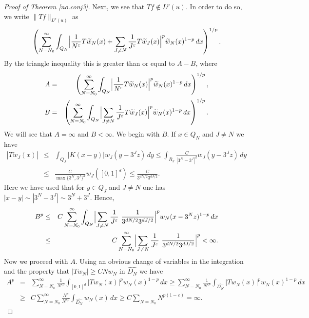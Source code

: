 \documentclass[11pt]{amsart}
\theoremstyle{definition}
\begin{document}
\begin{proof}[Proof of Theorem \ref{no.conj3}]
Next, we see that $Tf\not\in L^p(u)$. In order to do so, we write $\|Tf\|_{L^p(u)}$ as
\[
\left(\sum_{N=N_0}^\infty \int_{Q_N}\Bigl|\frac{1}{N^{\varepsilon}} T\widetilde w_N(x)+\sum_{J\neq N} \frac1{J^{\varepsilon}} T\widetilde w_J(x)\Bigr|^p \widetilde w_N(x)^{1-p}\,dx\right)^{1/p}.
\]
By the triangle inequality this is greater than or equal to $A-B$, where
\begin{eqnarray*}
A&=&\left(\sum_{N=N_0}^\infty \int_{Q_N}\Bigl|\frac{1}{N^{\varepsilon}} T\widetilde w_N(x)\Bigr|^p \widetilde w_N(x)^{1-p}\,dx\right)^{1/p},\\ B&=&\left(\sum_{N=N_0}^\infty \int_{Q_N}\Bigl|\sum_{J\neq N} \frac1{J^{\varepsilon}} T\widetilde w_J(x)\Bigr|^p \widetilde w_N(x)^{1-p}\,dx\right)^{1/p}.
\end{eqnarray*}
We will see that $A=\infty$ and $B<\infty$. We begin with $B$. If $x\in Q_N$ and $J\neq N$ we have
\begin{eqnarray*}
|T\widetilde w_J(x)|&\leq& \int_{Q_J} |K(x-y)|w_J(y-3^Jz)\,dy \leq \int_{R_J} \frac{C}{|3^N-3^J|^d} w_J(y-3^Jz)\,dy \\&\leq& \frac{C}{\max\{3^N,3^J\}^{d}} w_J([0,1]^d)\leq  \frac C{3^{dN/2}3^{dJ/2}}.
\end{eqnarray*}
Here we have used that for $y\in Q_J$ and $J\neq N$ one has $|x-y|\sim |3^N-3^J|\sim 3^N+3^J$. Hence,
\begin{eqnarray*}
B^p &\leq& C\sum_{N=N_0}^\infty \int_{Q_N}\Bigl|\sum_{J\neq N} \frac1{J^{\varepsilon}}\ \frac1{3^{dN/2}3^{dJ/2}} \Bigr|^p w_N(x-3^Nz)^{1-p}\,dx
\\ &\leq& C\sum_{N=N_0}^\infty \Bigl|\sum_{J\neq N} \frac1{J^{\varepsilon}}\ \frac1{3^{dN/2}3^{dJ/2}} \Bigr|^p < \infty.
\end{eqnarray*}
Now we proceed with $A$. Using an obvious change of variables in the integration and the property that $|Tw_N|\geq CN w_N$ in $\widehat{D_N}$ we have
\begin{eqnarray*}
A^p &=& \sum_{N=N_0}^\infty \frac1{N^{{\varepsilon} p}} \int_{[0,1]^d}|Tw_N(x)|^p w_N(x)^{1-p}\,dx \geq \sum_{N=N_0}^\infty \frac1{N^{{\varepsilon} p}} \int_{\widehat{D_N}}|Tw_N(x)|^p w_N(x)^{1-p}\,dx\\ &\geq& C \sum_{N=N_0}^\infty \frac {N^p}{N^{{\varepsilon} p}} \int_{\widehat{D_N}} w_N(x)\,dx \geq C\sum_{N=N_0} N^{p(1-{\varepsilon})}=\infty.
\end{eqnarray*}

\bigskip


\end{proof}
\end{document}
